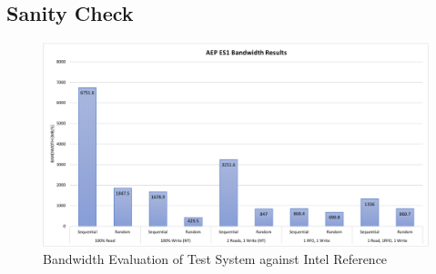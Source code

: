 \subsection{Sanity Check}

\begin{figure}
    \centering
    \caption{Bandwidth Evaluation of Test System against Intel Reference}\label{chart:aep:bw}
    \includegraphics[scale=0.5]{charts/aep_eval_bandwidth-crop.pdf}
\end{figure}

